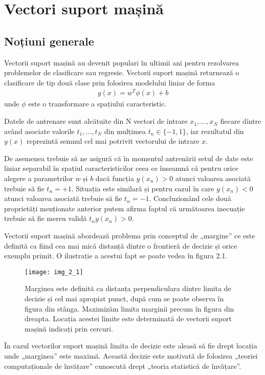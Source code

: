 \section{Vectori suport mașină}

\subsection{Noțiuni generale}

Vectorii suport mașină au devenit populari în ultimii ani pentru rezolvarea problemelor de clasificare sau regresie. Vectorii suport mașină returnează o clasificare de tip două clase prin folosirea modelului liniar de forma
\begin{align}
	y(x) = w^T\phi(x) + b
\end{align}
unde $\phi$ este o transformare a spațiului caracteristic.

Datele de antrenare sunt alcătuite din N vectori de intrare $x_1, ...,x_N$ fiecare dintre având asociate valorile $t_1, ...,t_N$ din mulțimea $t_n \in \{-1,1\}$, iar rezultatul din $y(x)$ reprezintă semnul cel mai potrivit vectorului de intrare $x$.

De asemenea trebuie să ne asigură că în momentul antrenării setul de date este liniar separabil în spațiul caracteristicilor ceea ce înseamnă că pentru orice alegere a parametrilor $w$ și $b$ dacă funcția $y(x_n) > 0$ atunci valoarea asociată trebuie să fie $t_n = +1$. Situația este similară și pentru cazul în care $y(x_n ) < 0$ atunci valoarea asociată trebuie să fie $t_n = -1$. Concluzionând cele două proprietăți menționate anterior putem afirma faptul că următoarea inecuație trebuie să fie mereu validă  $t_n y(x_n) > 0$. 

Vectorii suport mașină abordează problema prin conceptul de „margine” ce este definită ca fiind cea mai mică distanță dintre o frontieră de decizie și orice exemplu primit. O ilustrație a acestui fapt se poate vedea în figura 2.1.
\begin{figure}[!h]
	\centering
	\texttt{[image: img\_2\_1]}
	\caption{Marginea este definită ca distanța perpendiculara dintre limita de decizie și cel mai apropiat punct, după cum se poate observa în figura din stânga. Maximizăm limita marginii precum în figura din dreapta. Locația acestei limite este determinată de vectorii suport mașină indicați prin cercuri.}
\end{figure} 

În cazul vectorilor suport mașină limita de decizie este aleasă să fie drept locația unde „marginea” este maximă. Această decizie este motivată de folosirea „teoriei computaționale de învățare” cunoscută drept „teoria statistică de învățare”. 

